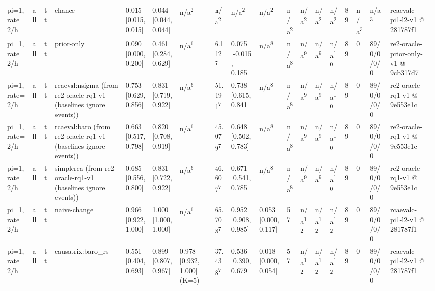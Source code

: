\begin{table}[t]
\begin{tabular}{llllllllllllllllll}
pi=1, rate=2/h & all & tt & chance & 0.015 [0.015, 0.015] & 0.044 [0.044, 0.044] & n/a\textsuperscript{2} & n/a\textsuperscript{2} & n/a\textsuperscript{2} & n/a\textsuperscript{2} & n/a\textsuperscript{2} & n/a\textsuperscript{2} & n/a\textsuperscript{2} & n/a\textsuperscript{2} & 89 & n/a\textsuperscript{3} & n/a\textsuperscript{3} & rcaevalc-pi1-l2-v1 @ 281787f1 \\
pi=1, rate=2/h & all & tt & prior-only & 0.090 [0.000, 0.200] & 0.461 [0.284, 0.629] & n/a\textsuperscript{6} & 6.112\textsuperscript{7} & 0.075 [-0.015, 0.185] & n/a\textsuperscript{8} & n/a\textsuperscript{8} & n/a\textsuperscript{9} & n/a\textsuperscript{9} & n/a\textsuperscript{10} & 89 & 0 & 89/0/0/0/0 & re2-oracle-prior-only-v1 @ 9cb317d7 \\
pi=1, rate=2/h & all & tt & rcaeval:nsigma (from re2-oracle-rq1-v1 (baselines ignore events)) & 0.753 [0.629, 0.856] & 0.831 [0.719, 0.922] & n/a\textsuperscript{6} & 51.191\textsuperscript{7} & 0.738 [0.615, 0.841] & n/a\textsuperscript{8} & n/a\textsuperscript{8} & n/a\textsuperscript{9} & n/a\textsuperscript{9} & n/a\textsuperscript{10} & 89 & 0 & 89/0/0/0/0 & re2-oracle-rq1-v1 @ 9e553e1c \\
pi=1, rate=2/h & all & tt & rcaeval:baro (from re2-oracle-rq1-v1 (baselines ignore events)) & 0.663 [0.517, 0.798] & 0.820 [0.708, 0.919] & n/a\textsuperscript{6} & 45.079\textsuperscript{7} & 0.648 [0.502, 0.783] & n/a\textsuperscript{8} & n/a\textsuperscript{8} & n/a\textsuperscript{9} & n/a\textsuperscript{9} & n/a\textsuperscript{10} & 89 & 0 & 89/0/0/0/0 & re2-oracle-rq1-v1 @ 9e553e1c \\
pi=1, rate=2/h & all & tt & simplerca (from re2-oracle-rq1-v1 (baselines ignore events)) & 0.685 [0.556, 0.800] & 0.831 [0.722, 0.922] & n/a\textsuperscript{6} & 46.607\textsuperscript{7} & 0.671 [0.541, 0.785] & n/a\textsuperscript{8} & n/a\textsuperscript{8} & n/a\textsuperscript{9} & n/a\textsuperscript{9} & n/a\textsuperscript{10} & 89 & 0 & 89/0/0/0/0 & re2-oracle-rq1-v1 @ 9e553e1c \\
pi=1, rate=2/h & all & tt & naive-change & 0.966 [0.922, 1.000] & 1.000 [1.000, 1.000] & n/a\textsuperscript{6} & 65.708\textsuperscript{7} & 0.952 [0.908, 0.985] & 0.053 [0.000, 0.117] & 57 & n/a\textsuperscript{12} & n/a\textsuperscript{12} & n/a\textsuperscript{12} & 89 & 0 & 89/0/0/0/0 & rcaevalc-pi1-l2-v1 @ 281787f1 \\
pi=1, rate=2/h & all & tt & causatrix:baro\_rs & 0.551 [0.404, 0.693] & 0.899 [0.807, 0.967] & 0.978 [0.932, 1.000] (K=5) & 37.438\textsuperscript{7} & 0.536 [0.390, 0.679] & 0.018 [0.000, 0.054] & 57 & n/a\textsuperscript{12} & n/a\textsuperscript{12} & n/a\textsuperscript{12} & 89 & 0 & 89/0/0/0/0 & rcaevalc-pi1-l2-v1 @ 281787f1 \\

\end{tabular}
\end{table}
